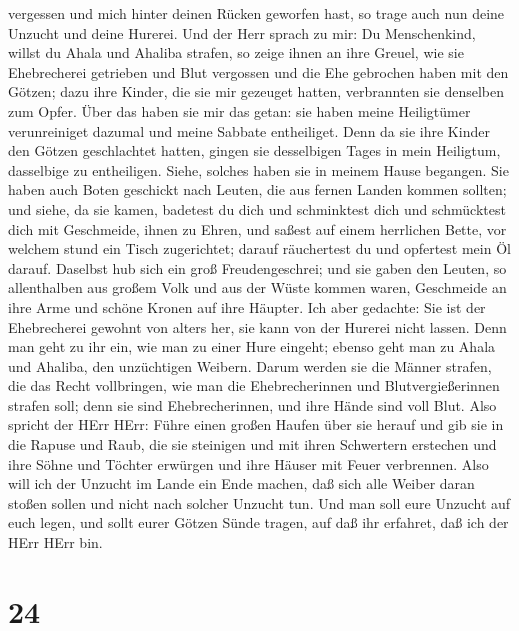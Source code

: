vergessen und mich hinter deinen Rücken geworfen hast, so trage auch nun
deine Unzucht und deine Hurerei.  Und der Herr sprach zu
mir: Du Menschenkind, willst du Ahala und Ahaliba strafen, so zeige
ihnen an ihre Greuel,  wie sie Ehebrecherei getrieben und
Blut vergossen und die Ehe gebrochen haben mit den Götzen; dazu ihre
Kinder, die sie mir gezeuget hatten, verbrannten sie denselben zum
Opfer.  Über das haben sie mir das getan: sie haben meine
Heiligtümer verunreiniget dazumal und meine Sabbate entheiliget.
 Denn da sie ihre Kinder den Götzen geschlachtet hatten,
gingen sie desselbigen Tages in mein Heiligtum, dasselbige zu
entheiligen. Siehe, solches haben sie in meinem Hause begangen.
 Sie haben auch Boten geschickt nach Leuten, die aus fernen
Landen kommen sollten; und siehe, da sie kamen, badetest du dich und
schminktest dich und schmücktest dich mit Geschmeide, ihnen zu Ehren,
 und saßest auf einem herrlichen Bette, vor welchem stund
ein Tisch zugerichtet; darauf räuchertest du und opfertest mein Öl
darauf.  Daselbst hub sich ein groß Freudengeschrei; und
sie gaben den Leuten, so allenthalben aus großem Volk und aus der Wüste
kommen waren, Geschmeide an ihre Arme und schöne Kronen auf ihre
Häupter.  Ich aber gedachte: Sie ist der Ehebrecherei
gewohnt von alters her, sie kann von der Hurerei nicht lassen.
 Denn man geht zu ihr ein, wie man zu einer Hure eingeht;
ebenso geht man zu Ahala und Ahaliba, den unzüchtigen Weibern.
 Darum werden sie die Männer strafen, die das Recht
vollbringen, wie man die Ehebrecherinnen und Blutvergießerinnen strafen
soll; denn sie sind Ehebrecherinnen, und ihre Hände sind voll Blut.
 Also spricht der HErr HErr: Führe einen großen Haufen über
sie herauf und gib sie in die Rapuse und Raub,  die sie
steinigen und mit ihren Schwertern erstechen und ihre Söhne und Töchter
erwürgen und ihre Häuser mit Feuer verbrennen.  Also will
ich der Unzucht im Lande ein Ende machen, daß sich alle Weiber daran
stoßen sollen und nicht nach solcher Unzucht tun.  Und man
soll eure Unzucht auf euch legen, und sollt eurer Götzen Sünde tragen,
auf daß ihr erfahret, daß ich der HErr HErr bin.

\hypertarget{section-23}{%
\section{24}\label{section-23}}

